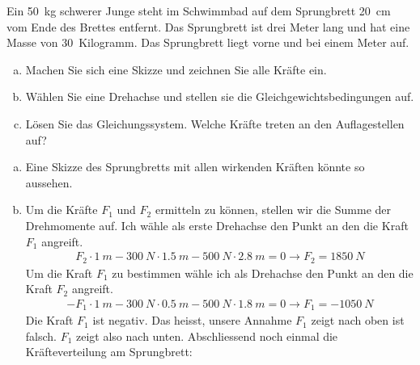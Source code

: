 
\begin{aufgabe}
	Ein \SI{50}{kg} schwerer Junge steht im Schwimmbad auf dem Sprungbrett \SI{20}{cm} vom Ende des Brettes entfernt.
	Das Sprungbrett ist drei Meter lang und hat eine Masse von \SI{30}{Kilogramm}.
	Das Sprungbrett liegt vorne und bei einem Meter auf.
	\begin{enumerate} [a)]
		\item Machen Sie sich eine Skizze und zeichnen Sie alle Kräfte ein.
		\item Wählen Sie eine Drehachse und stellen sie die Gleichgewichtsbedingungen auf.
		\item Lösen Sie das Gleichungssystem. Welche Kräfte treten an den Auflagestellen auf?
	\end{enumerate}
	\begin{loesung}
		\begin{enumerate} [a)]
			\item Eine Skizze des Sprungbretts mit allen wirkenden Kräften könnte so aussehen.
		\begin{center}
		\end{center}
		\item Um die Kräfte $F_1$ und $F_2$ ermitteln zu können, stellen wir die Summe der Drehmomente auf.
			Ich wähle als erste Drehachse den Punkt an den die Kraft $F_1$ angreift.
			\begin{eqnarray*}
				F_2\cdot\SI{1}{m} -\SI{300}{N}\cdot\SI{1.5}{m} - \SI{500}{N}\cdot\SI{2.8}{m}=0\to F_2=\SI{1850}{N}
			\end{eqnarray*}
			Um die Kraft $F_1$ zu bestimmen wähle ich als Drehachse den Punkt an den die Kraft $F_2$ angreift.
			\begin{eqnarray*}
				-F_1\cdot\SI{1}{m} - \SI{300}{N}\cdot\SI{0.5}{m} -\SI{500}{N}\cdot\SI{1.8}{m}=0\to F_1=-\SI{1050}{N}
			\end{eqnarray*}
			Die Kraft $F_1$ ist negativ. Das heisst, unsere Annahme $F_1$ zeigt nach oben ist falsch. $F_1$ zeigt also nach unten.
			Abschliessend noch einmal die Kräfteverteilung am Sprungbrett:
		\begin{center}

\end{center}
\end{enumerate}
\end{loesung}
\end{aufgabe}
